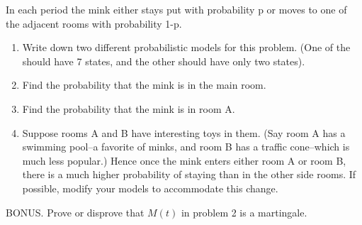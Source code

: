 \documentclass[12pt]{article}
\begin{document}
\begin{enumerate}
In each period the mink either stays put with probability p or moves
to one of the adjacent rooms with probability 1-p.  
\begin{enumerate}
\item Write down two different probabilistic models for this problem.
(One of the should have 7 states, and the other should have only two
states). 
\item Find the probability that the mink is in the main room.
\item Find the probability that the mink is in room A.
\item Suppose rooms A and B have interesting toys in them.  (Say room
A has a swimming pool--a favorite of minks, and room B has a traffic
cone--which is much less popular.)  Hence once the mink enters either
room A or room B, there is a much higher probability of staying than
in the other side rooms.  If possible, modify your models to
accommodate this change.
\end{enumerate}

\end{enumerate}
BONUS. Prove or disprove that $M(t)$ in problem 2 is a martingale.
\end{document}
